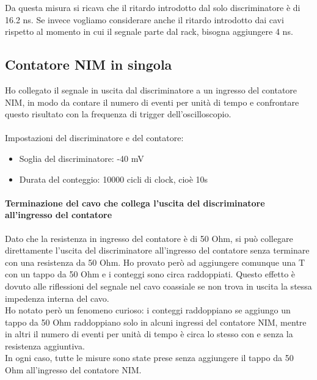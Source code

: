 \documentclass{article}
\begin{document}
Da questa misura si ricava che il ritardo introdotto dal solo discriminatore è di 16.2 ns. Se invece vogliamo considerare anche il ritardo introdotto dai cavi rispetto al momento in cui il segnale parte dal rack, bisogna aggiungere 4 ns.

\subsection{Contatore NIM in singola}
Ho collegato il segnale in uscita dal discriminatore a un ingresso del contatore NIM, in modo da contare il numero di eventi per unità di tempo e confrontare questo risultato con la frequenza di trigger dell'oscilloscopio. \\
\\Impostazioni del discriminatore e del contatore: 
\begin{itemize}
    \item Soglia del discriminatore: -40 mV
    \item Durata del conteggio: 10000 cicli di clock, cioè 10s
\end{itemize}
\paragraph{Terminazione del cavo che collega l'uscita del discriminatore all'ingresso del contatore}
Dato che la resistenza in ingresso del contatore è di 50 Ohm, si può collegare direttamente l'uscita del discriminatore all'ingresso del contatore senza terminare con una resistenza da 50 Ohm. Ho provato però ad aggiungere comunque una T con un tappo da 50 Ohm e i conteggi sono circa raddoppiati. Questo effetto è dovuto alle riflessioni del segnale nel cavo coassiale se non trova in uscita la stessa impedenza interna del cavo. 
\\
Ho notato però un fenomeno curioso: i conteggi raddoppiano se aggiungo un tappo da 50 Ohm raddoppiano solo in alcuni ingressi del contatore NIM, mentre in altri il numero di eventi per unità di tempo è circa lo stesso con e senza la resistenza aggiuntiva.
\\
In ogni caso, tutte le misure sono state prese senza aggiungere il tappo da 50 Ohm all'ingresso del contatore NIM.
\end{document}
